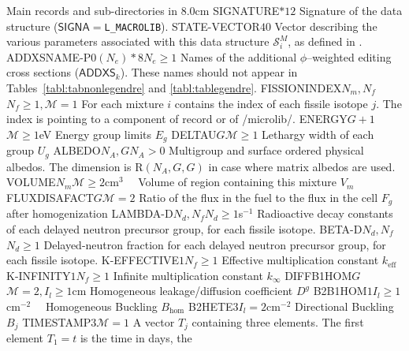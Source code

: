 \begin{DescriptionEnregistrement}{Main records and sub-directories in }{8.0cm}
\CharEnr
  {SIGNATURE}{$*12$}
  {Signature of the  data structure ($\mathsf{SIGNA}=${\tt L\_MACROLIB}).}
\IntEnr
  {STATE-VECTOR}{$40$}
  {Vector describing the various parameters associated with this data structure
  $\mathcal{S}^{M}_{i}$, as defined in .}
\OptCharEnr
  {ADDXSNAME-P0}{$(N_{e})*8$}{$N_{e} \ge 1$}
  {Names of the additional $\phi$--weighted editing cross sections ($\mathsf{ADDXS}_k$).
  These names should not appear in Tables~\ref{tabl:tabnonlegendre} and \ref{tabl:tablegendre}.}
\OptIntEnr
  {FISSIONINDEX}{$N_{m},N_{f}$}{$N_{f} \ge 1,\mathcal{M}=1$}
  {For each mixture $i$ contains the index of each fissile isotope $j$. The index is
   pointing to a component of record  or 
   of /microlib/.}
\OptRealEnr
  {ENERGY}{$G+1$}{$\mathcal{M}\ge 1$}{eV}
  {Energy group limits $E_{g}$}
\OptRealEnr
  {DELTAU}{$G$}{$\mathcal{M}\ge 1$}{}
  {Lethargy width of each group $U_{g}$}
\OptRealEnr
  {ALBEDO}{$N_{A}, G$}{$N_{A}> 0$}{}
  {Multigroup and surface ordered physical albedos. The dimension is R$(N_{A},G,G)$ in case where matrix albedos are used.}
\OptRealEnr
  {VOLUME}{$N_{m}$}{$\mathcal{M}\ge 2$}{cm$^{3}$~~}
  {Volume of region containing this mixture $V_{m}$}
\OptRealEnr
  {FLUXDISAFACT}{$G$}{$\mathcal{M}=2$}{}
  {Ratio of the flux in the fuel to the flux in the cell $F_{g}$ after homogenization}
\OptRealEnr
  {LAMBDA-D}{$N_{d},N_{f}$}{$N_{d}\ge 1$}{s$^{-1}$}
  {Radioactive decay constants of each delayed neutron precursor group, for each
  fissile isotope.}
\OptRealEnr
  {BETA-D}{$N_{d},N_{f}$}{$N_{d}\ge 1$}{}
  {Delayed-neutron fraction for each delayed neutron precursor group, for each
  fissile isotope.}
\OptRealEnr
  {K-EFFECTIVE}{$1$}{$N_{f} \ge 1$}{}
  {Effective multiplication constant $k_{\mathrm{eff}}$}
\OptRealEnr
  {K-INFINITY}{$1$}{$N_{f} \ge 1$}{}
  {Infinite multiplication constant $k_{\infty}$}
\OptRealEnr
  {DIFFB1HOM}{$G$}{$\mathcal{M}=2,I_{l} \ge 1$}{cm}
  {Homogeneous leakage/diffusion coefficient $D^{g}$}
\OptRealEnr
  {B2B1HOM}{$1$}{$I_{l} \ge 1$}{cm$^{-2}$~~}
  {Homogeneous Buckling $B_{\mathrm{hom}}$}
\OptRealEnr
  {B2HETE}{$3$}{$I_{l}=2$}{cm$^{-2}$}
  {Directional Buckling $B_{j}$}
\OptRealEnr
  {TIMESTAMP}{$3$}{$\mathcal{M}=1$}{}
  {A vector $T_{j}$ containing three elements. The first element $T_{1}=t$ is the time in days, the
}
\end{DescriptionEnregistrement}
